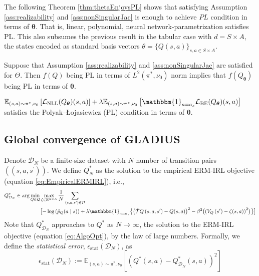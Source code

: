 \noindent The following Theorem \ref{thm:thetaEnjoysPL} shows that satisfying Assumption \ref{ass:realizability} and \ref{ass:nonSingularJac} is enough to achieve $PL$ condition in terms of $\boldsymbol{\theta}$. That is, linear, polynomial, neural network-parametrization satisfies PL.
This also subsumes the previous result in the tabular case with $d=S\times A$, the states encoded as standard basis vectors $\theta = \{Q(s,a)\}_{s,a\in S\times A}$. 

\begin{thm}\label{thm:thetaEnjoysPL} Suppose that Assumption \ref{ass:realizability} and \ref{ass:nonSingularJac} are satisfied for $\Theta$.
 Then $f(Q)$ being PL in terms of $L^2(\pi^*,\nu_0)$ norm implies that $f(Q_{\boldsymbol{\theta}})$ being PL in terms of $\boldsymbol{\theta}$.
\end{thm} 
\begin{cor}
    $\mathbb{E}_{(s, a)\sim \pi^*, \nu_0}  \left[\mathcal{L}_{\mathrm{NLL}}(Q_{\boldsymbol{\theta}})(s, a)\right]+\lambda \mathbb{E}_{(s, a)\sim \pi^*, \nu_0}  \left[\mathbbm{1}_{a=a_s}\mathcal{L}_{\mathrm{BE}}(Q_{\boldsymbol{\theta}})(s, a)\right]$ satisfies the Polyak–Łojasiewicz (PL) condition in terms of $\boldsymbol{\theta}$.
\end{cor}



\subsection{Global convergence of GLADIUS}

Denote $\mathcal{D}_N$ be a finite-size dataset with $N$ number of transition pairs $((s,a,s^\prime))$. We define $Q^\ast_N$ as the solution to the empirical ERM-IRL objective (equation \eqref{eq:EmpiricalERMIRL}), i.e., 
\begin{align}
    Q^{\ast}_{\mathcal{D}_N} \in \arg\min _{Q \in \mathcal{Q}}&\max_{\zeta\in \mathbb{R}^{S\times A}}\frac{1}{N} \sum_{(s,a,s^\prime)\in \mathcal{D}}\notag
    \\
    &\bigl[{-\log \left(\hat{p}_Q(a \mid s)\right)} + 
   \lambda\mathbbm{1}_{a=a_s}\bigl\{\bigl(\hat{\mathcal{T}} Q\left(s, a, s^{\prime}\right)-Q(s, a)\bigr)^2 -\beta^2  \bigl({\left(V_{Q}\left(s^{\prime}\right)-\zeta(s,a)\right)^2}\bigr) \bigr\} \bigr]\notag
\end{align}
Note that $Q^{\ast}_{\mathcal{D}_N}$ approaches to $Q^\ast$ as $N\rightarrow \infty$, the solution to the ERM-IRL objective (equation \eqref{eq:AlgoOpt}), by the law of large numbers. Formally, we define the \textit{statistical error}, $\epsilon_{\text{stat}}(\mathcal{D}_N)$, as
$$
\epsilon_{\text{stat}}(\mathcal{D}_N):=\mathbb{E}_{(s, a) \sim \pi^*, \nu_0}\left[\left(Q^*(s, a)-Q^\ast_{\mathcal{D}_N}(s, a)\right)^2\right]
$$

